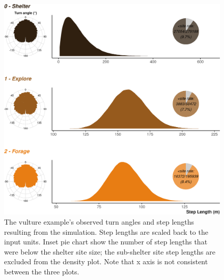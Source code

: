 \documentclass[10pt,a4paper]{article}
\begin{document}
\begin{figure}

{\centering \includegraphics{Agent-based_model_walkthrough_files/figure-latex/VULTUREmoveCharFigure-1} 

}

\caption{The vulture example's observed turn angles and step lengths resulting from the simulation. Step lengths are scaled back to the input units. Inset pie chart show the number of step lengths that were below the shelter site size; the sub-shelter site step lengths are excluded from the density plot. Note that x axis is not consistent between the three plots.}\label{fig:VULTUREmoveCharFigure}
\end{figure}
\end{document}
